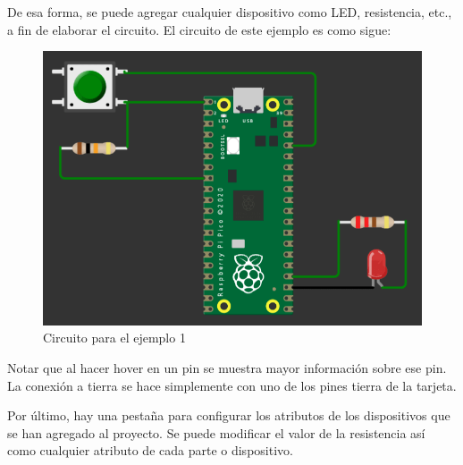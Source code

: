 \documentclass{article}
\begin{document}
    De esa forma, se puede agregar cualquier dispositivo como LED, resistencia, etc., a fin de elaborar el circuito. El circuito de este ejemplo es como sigue:

    \begin{figure}[H]
        \centering
        \includegraphics[width=0.4\paperwidth]{images/wokwi-example-1-circuit}
        \caption{Circuito para el ejemplo 1}
    \end{figure}

    Notar que al hacer hover en un pin se muestra mayor información sobre ese pin. La conexión a tierra se hace simplemente con uno de los pines tierra de la tarjeta.

    \bigbreak

    Por último, hay una pestaña para configurar los atributos de los dispositivos que se han agregado al proyecto. Se puede modificar el valor de la resistencia así como cualquier atributo de cada parte o dispositivo.
\end{document}
